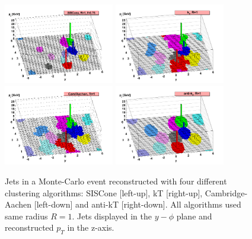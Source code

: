 \begin{figure}[!Hhtbp]
  \begin{center}
    \includegraphics[width=0.43\textwidth]{figs/herwig-parton-level-ev-siscone-R1-0-f0-75-ghosted4root.png}
    \includegraphics[width=0.43\textwidth]{figs/herwig-parton-level-ev-kt-R1-0-ghosted4root.png}
    \includegraphics[width=0.43\textwidth]{figs/herwig-parton-level-ev-cam-R1-0-ghosted4root.png}
    \includegraphics[width=0.43\textwidth]{figs/herwig-parton-level-ev-antikt-R1-0-ghosted4root.png}
    \caption{Jets in a Monte-Carlo event reconstructed with four different clustering algorithms: SISCone [left-up], kT [right-up], Cambridge-Aachen [left-down] and anti-kT [right-down]. All algorithms used same radius $R=1$. Jets displayed in the $y-\phi$ plane and reconstructed $p_{T}$ in the z-axis.}
    \label{fig:JetsAlgos}
  \end{center}
\end{figure}

